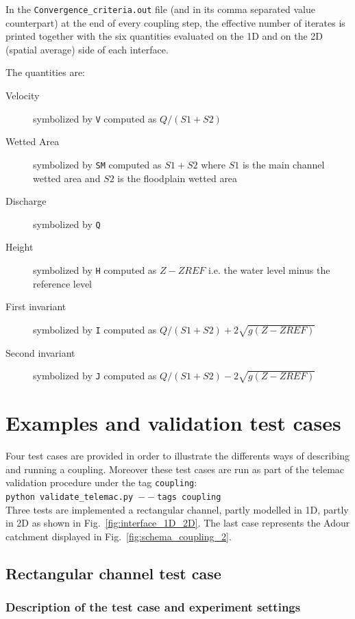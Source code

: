 \documentclass[Coupling]{../../data/TelemacDoc} %
\begin{document}
In the \texttt{Convergence\_criteria.out} file (and in its comma
separated value counterpart) at the end of every coupling step, the
effective number of iterates is printed together with the six quantities
evaluated on the 1D and on the 2D (spatial average) side of each
interface.

The quantities are:
\begin{description}
\item[Velocity] symbolized by \texttt{V} computed as $Q/(S1+S2)$
\item[Wetted Area] symbolized by \texttt{SM} computed as $S1+S2$ where
  $S1$ is the main channel wetted area and $S2$ is the floodplain
  wetted area
\item[Discharge] symbolized by \texttt{Q} 
\item[Height] symbolized by \texttt{H} computed as $Z-ZREF$ i.e. the
  water level minus the reference level
\item[First invariant] symbolized by \texttt{I} computed as $Q/(S1+S2)+2\sqrt{g(Z-ZREF)}$
\item[Second invariant] symbolized by \texttt{J} computed as $Q/(S1+S2)-2\sqrt{g(Z-ZREF)}$
\end{description}

\chapter{Examples and validation test cases}

Four test cases are provided in order to illustrate the differents
ways of describing and running a coupling. Moreover these test cases
are run as part of the telemac validation procedure under the tag
\texttt{coupling}:\\
\texttt{python validate\_telemac.py $--$tags coupling}\\

Three tests are implemented a rectangular channel, partly modelled in 1D,
partly in 2D as shown in Fig.~\ref{fig:interface_1D_2D}. The last case
represents the Adour catchment displayed 
in Fig.~\ref{fig:schema_coupling_2}.  

\section{Rectangular channel test case}

\subsection{Description of the test case and experiment settings}
\end{document}
